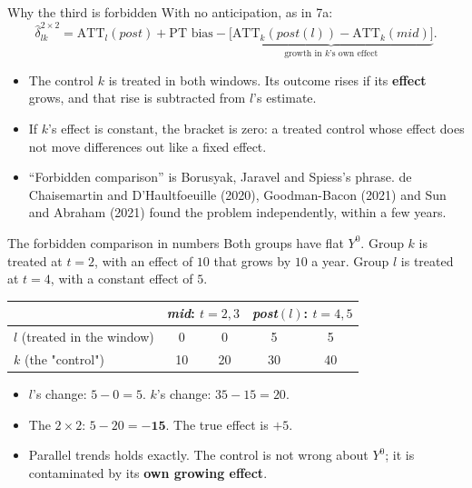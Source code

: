 \documentclass[
  11pt,
  ignorenonframetext,
  aspectratio=169,
]{beamer}
\providecommand{\tightlist}{%
  \setlength{\itemsep}{0pt}\setlength{\parskip}{0pt}}
\begin{document}
\begin{frame}{Why the third is forbidden}
\protect{}\label{why-the-third-is-forbidden}
With no anticipation, as in 7a: \[
\hat\delta^{2\times2}_{lk} = \text{ATT}_l(post) + \text{PT bias} - \underbrace{\big[\text{ATT}_k(post(l)) - \text{ATT}_k(mid)\big]}_{\text{growth in } k\text{'s own effect}} .
\]

\begin{itemize}
\tightlist
\item
  The control \(k\) is treated in both windows. Its outcome rises if its
  \textbf{effect} grows, and that rise is subtracted from \(l\)'s
  estimate.
\item
  If \(k\)'s effect is constant, the bracket is zero: a treated control
  whose effect does not move differences out like a fixed effect.
\item
  ``Forbidden comparison'' is Borusyak, Jaravel and Spiess's phrase. de
  Chaisemartin and D'Haultfoeuille (2020), Goodman-Bacon (2021) and Sun
  and Abraham (2021) found the problem independently, within a few
  years.
\end{itemize}
\end{frame}

\begin{frame}{The forbidden comparison in numbers}
\protect{}\label{the-forbidden-comparison-in-numbers}
Both groups have flat \(Y^0\). Group \(k\) is treated at \(t = 2\), with
an effect of \(10\) that grows by \(10\) a year. Group \(l\) is treated
at \(t = 4\), with a constant effect of \(5\).

\begin{center}\small
\begin{tabular}{lcccc}
\toprule
 & \multicolumn{2}{c}{\emph{mid}: $t = 2, 3$} & \multicolumn{2}{c}{\emph{post}$(l)$: $t = 4, 5$} \\
\midrule
$l$ (treated in the window) & 0 & 0 & 5 & 5 \\
$k$ (the "control") & 10 & 20 & 30 & 40 \\
\bottomrule
\end{tabular}
\end{center}

\begin{itemize}
\tightlist
\item
  \(l\)'s change: \(5 - 0 = 5\). \(k\)'s change: \(35 - 15 = 20\).
\item
  The \(2 \times 2\): \(5 - 20 = \mathbf{-15}\). The true effect is
  \(+5\).
\item
  Parallel trends holds exactly. The control is not wrong about \(Y^0\);
  it is contaminated by its \textbf{own growing effect}.
\end{itemize}
\end{frame}
\end{document}
